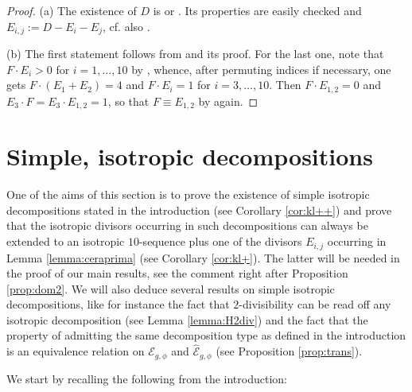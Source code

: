 \documentclass[11pt]{amsart}
\theoremstyle{definition}
\def\E{{\mathcal E}}
\begin{document}
\begin{proof} (a) The existence of $D$ is \cite[Lemma 1.6.2(i)]{cos2} or \cite[Cor. 2.5.5]{cd}. Its properties are easily checked and $E_{i,j}:=D-E_i-E_j$, cf. also \cite[Lemma 1.6.2(ii)]{cos2}.

(b) The first statement follows from \cite[Cor.~2.5.5]{cd} and its
proof.  For the last one, note that $F \cdot E_i >0$ 
for $i=1,\ldots, 10$ by
\cite[Lemma~2.1]{klvan}, whence, after permuting indices if necessary,
one gets
$F \cdot (E_1+ E_2)=4$ 
and $F \cdot E_i=1$ for $i=3,\ldots,10$.
Then $F \cdot E_{1,2}=0$ and $E_3 \cdot F=E_3
\cdot E_{1,2}=1$, so that $F \equiv E_{1,2}$ by \cite[Lemma
2.1]{klvan} again.
\end{proof}









 


\section{ Simple,  isotropic decompositions} \label{sec:bas1}

 One of the aims of this section  is to prove the existence of simple isotropic decompositions stated in the introduction (see Corollary \ref{cor:kl++}) and prove  that the isotropic divisors
occurring in such decompositions can always be extended
to an isotropic $10$-sequence plus one of the divisors $E_{i,j}$
occurring in Lemma \ref{lemma:ceraprima}  (see Corollary \ref{cor:kl+}).  The latter  will be needed in the
proof of our main results, see the comment right after
 Proposition  \ref{prop:dom2}.  We will also deduce several results on simple isotropic decompositions, like for instance the fact that $2$-divisibility can be read off any isotropic decomposition (see Lemma \ref{lemma:H2div})  and the fact that the property of admitting the same decomposition type as defined in the introduction is an equivalence relation on $\E_{g,\phi}$ and $\widehat{\E}_{g,\phi}$ (see Proposition \ref{prop:trans}).


 We start by recalling the  following from the introduction:
\end{document}
